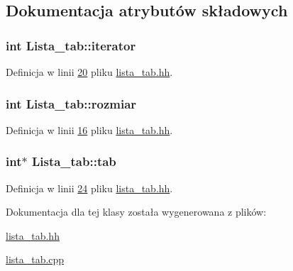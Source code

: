 \subsection{Dokumentacja atrybutów składowych}
\hypertarget{class_lista__tab_afd2c6ba3ae15e658890641b188c7ed39}{
\subsubsection[{iterator}]{\setlength{\rightskip}{0pt plus 5cm}int Lista\-\_\-tab\-::iterator\hspace{0.3cm}{\ttfamily [private]}}}\label{class_lista__tab_afd2c6ba3ae15e658890641b188c7ed39}


Definicja w linii \hyperlink{lista__tab_8hh_source_l00020}{20} pliku \hyperlink{lista__tab_8hh_source}{lista\-\_\-tab.\-hh}.

\hypertarget{class_lista__tab_a59e0425d896070457d1f3456b91842fd}{
\subsubsection[{rozmiar}]{\setlength{\rightskip}{0pt plus 5cm}int Lista\-\_\-tab\-::rozmiar\hspace{0.3cm}{\ttfamily [private]}}}\label{class_lista__tab_a59e0425d896070457d1f3456b91842fd}


Definicja w linii \hyperlink{lista__tab_8hh_source_l00016}{16} pliku \hyperlink{lista__tab_8hh_source}{lista\-\_\-tab.\-hh}.

\hypertarget{class_lista__tab_a123dfb670e5a5592e512c41cc4faf14e}{
\subsubsection[{tab}]{\setlength{\rightskip}{0pt plus 5cm}int$\ast$ Lista\-\_\-tab\-::tab\hspace{0.3cm}{\ttfamily [private]}}}\label{class_lista__tab_a123dfb670e5a5592e512c41cc4faf14e}


Definicja w linii \hyperlink{lista__tab_8hh_source_l00024}{24} pliku \hyperlink{lista__tab_8hh_source}{lista\-\_\-tab.\-hh}.



Dokumentacja dla tej klasy została wygenerowana z plików\-:\begin{DoxyCompactItemize}
\item 
\hyperlink{lista__tab_8hh}{lista\-\_\-tab.\-hh}\item 
\hyperlink{lista__tab_8cpp}{lista\-\_\-tab.\-cpp}\end{DoxyCompactItemize}
